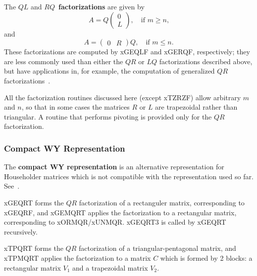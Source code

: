 The {\boldmath $QL$} and {\boldmath $RQ$}~{\bf factorizations}
 are given by
\[
A = Q \left( \begin{array}{c} 0 \\ L \end{array} \right) ,
\quad \mbox{if $m \geq n$,}
\]
and
\[
A = \left( \begin{array}{cc} 0 & R \end{array} \right) Q,
\quad \mbox{if $m \leq n$.}
\]
These factorizations are computed by xGEQLF and xGERQF, respectively; they are
less commonly used than either the $QR$ or $LQ$ factorizations
described above, but have applications in, for example, the
computation of generalized $QR$ factorizations~\cite{lawn31}.

All the factorization routines discussed here (except xTZRZF) allow
arbitrary $m$ and $n$, so that in some cases the matrices $R$ or $L$ are
trapezoidal rather than triangular.
A routine that performs pivoting is provided only for the $QR$ factorization.

\subsubsection{Compact WY Representation}

The {\bf compact WY representation} is an alternative representation for Householder matrices
which is not compatible with the representation used so far.
See~\cite{Schreiber87a}.

xGEQRT forms the $QR$ factorization
of a rectanguler matrix, corresponding to xGEQRF,
and xGEMQRT applies the factorization to a
rectangular matrix, corresponding to xORMQR/xUNMQR.
xGEQRT3 is called by xGEQRT recursively.
 
xTPQRT forms the $QR$ factorization
of a triangular-pentagonal matrix,
and xTPMQRT applies the factorization
to a matrix $C$ which is formed by 2 blocks: a rectangular matrix $V_{1}$ and
a trapezoidal matrix $V_{2}$.

